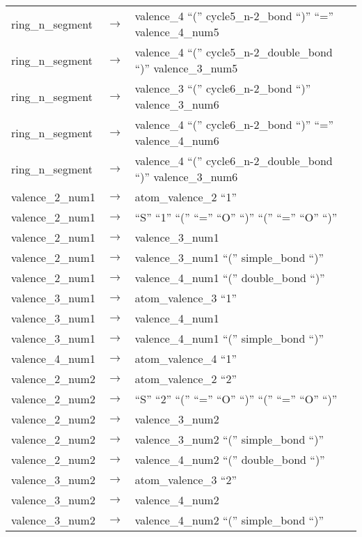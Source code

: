 \begin{longtable}{m{} p{} p{}}
    ring\_n\_segment & $\rightarrow$ & valence\_4 ``('' cycle5\_n-2\_bond ``)'' ``='' valence\_4\_num5 \\
    ring\_n\_segment & $\rightarrow$ & valence\_4 ``('' cycle5\_n-2\_double\_bond ``)'' valence\_3\_num5 \\
    ring\_n\_segment & $\rightarrow$ & valence\_3 ``('' cycle6\_n-2\_bond ``)'' valence\_3\_num6 \\
    ring\_n\_segment & $\rightarrow$ & valence\_4 ``('' cycle6\_n-2\_bond ``)'' ``='' valence\_4\_num6 \\
    ring\_n\_segment & $\rightarrow$ & valence\_4 ``('' cycle6\_n-2\_double\_bond ``)'' valence\_3\_num6 \\
    valence\_2\_num1 & $\rightarrow$ & atom\_valence\_2 ``1'' \\
    valence\_2\_num1 & $\rightarrow$ & ``S'' ``1'' ``('' ``='' ``O'' ``)'' ``('' ``='' ``O'' ``)'' \\
    valence\_2\_num1 & $\rightarrow$ & valence\_3\_num1 \\
    valence\_2\_num1 & $\rightarrow$ & valence\_3\_num1 ``('' simple\_bond ``)'' \\
    valence\_2\_num1 & $\rightarrow$ & valence\_4\_num1 ``('' double\_bond ``)'' \\
    valence\_3\_num1 & $\rightarrow$ & atom\_valence\_3 ``1'' \\
    valence\_3\_num1 & $\rightarrow$ & valence\_4\_num1 \\
    valence\_3\_num1 & $\rightarrow$ & valence\_4\_num1 ``('' simple\_bond ``)'' \\
    valence\_4\_num1 & $\rightarrow$ & atom\_valence\_4 ``1'' \\
    valence\_2\_num2 & $\rightarrow$ & atom\_valence\_2 ``2'' \\
    valence\_2\_num2 & $\rightarrow$ & ``S'' ``2'' ``('' ``='' ``O'' ``)'' ``('' ``='' ``O'' ``)'' \\
    valence\_2\_num2 & $\rightarrow$ & valence\_3\_num2 \\
    valence\_2\_num2 & $\rightarrow$ & valence\_3\_num2 ``('' simple\_bond ``)'' \\
    valence\_2\_num2 & $\rightarrow$ & valence\_4\_num2 ``('' double\_bond ``)'' \\
    valence\_3\_num2 & $\rightarrow$ & atom\_valence\_3 ``2'' \\
    valence\_3\_num2 & $\rightarrow$ & valence\_4\_num2 \\
    valence\_3\_num2 & $\rightarrow$ & valence\_4\_num2 ``('' simple\_bond ``)'' \\

\end{longtable}
